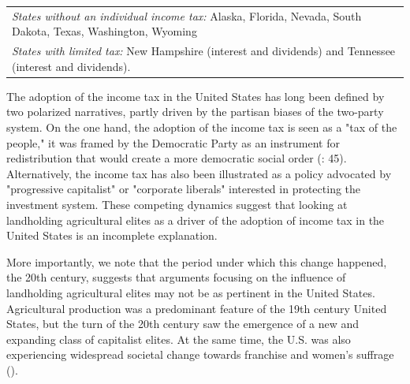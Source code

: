 \documentclass[letter, 12pt]{article}
\begin{document}
\begin{table}[]
{\begin{tabular}{lllll}
			\multicolumn{5}{l}{\emph{States without an individual income tax:} Alaska, Florida, Nevada, South Dakota, Texas, Washington, Wyoming} \\
			\multicolumn{5}{l}{\emph{States with limited tax:} New Hampshire (interest and dividends) and Tennessee (interest and dividends).}                                                                                                                                                                                                                                                                                                                                                                                                                                                                                                                                                                                                                                                                                                                                                                                                                                                                                                                        
		\end{tabular}%
	}
\end{table}

The adoption of the income tax in the United States has long been defined by two polarized narratives, partly driven by the partisan biases of the two-party system. On the one hand, the adoption of the income tax is seen as a "tax of the people," it was framed by the Democratic Party as an instrument for redistribution that would create a more democratic social order (\citealt{brownlee1993federal}: 45). Alternatively, the income tax has also been illustrated as a policy advocated by "progressive capitalist" or "corporate liberals" interested in protecting the investment system. These competing dynamics suggest that looking at landholding agricultural elites as a driver of the adoption of income tax in the United States is an incomplete explanation. 

More importantly, we note that the period under which this change happened, the 20th century, suggests that arguments focusing on the influence of landholding agricultural elites may not be as pertinent in the United States. Agricultural production was a predominant feature of the 19th century United States, but the turn of the 20th century saw the emergence of a new and expanding class of capitalist elites. At the same time, the U.S. was also experiencing widespread societal change towards franchise and women's suffrage (\citealt{baker1984domestication}). 
\end{document}
